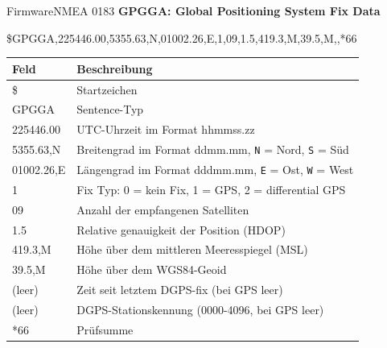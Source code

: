 \documentclass{beamer}
\begin{document}
\begin{frame}{Firmware}{NMEA 0183}
\textbf{GPGGA: Global Positioning System Fix Data}

\begin{scriptsize}
    \begin{center}
        \$GPGGA,225446.00,5355.63,N,01002.26,E,1,09,1.5,419.3,M,39.5,M,,*66
    \end{center}
    \begin{table}[H]
        \centering
        \begin{tabular}{|l|l|}
            \hline
            \textbf{Feld}   & \textbf{Beschreibung}\\
            \hline
            \$              & Startzeichen\\
            GPGGA           & Sentence-Typ\\
            225446.00       & UTC-Uhrzeit im Format hhmmss.zz\\
            5355.63,N       & Breitengrad im Format ddmm.mm, \texttt{N} = Nord, \texttt{S} = Süd\\
            01002.26,E      & Längengrad im Format dddmm.mm, \texttt{E} = Ost, \texttt{W} = West\\
            1               & Fix Typ: 0 = kein Fix, 1 = GPS, 2 = differential GPS\\
            09              & Anzahl der empfangenen Satelliten\\
            1.5             & Relative genauigkeit der Position (HDOP)\\
            419.3,M         & Höhe über dem mittleren Meeresspiegel (MSL)\\
            39.5,M          & Höhe über dem WGS84-Geoid\\
            (leer)          & Zeit seit letztem DGPS-fix (bei GPS leer)\\
            (leer)          & DGPS-Stationskennung (0000-4096, bei GPS leer)\\
            *66             & Prüfsumme\\
            \hline
        \end{tabular}
    \end{table}
\end{scriptsize}
\end{frame}
\end{document}
